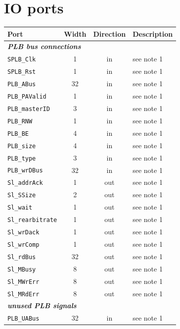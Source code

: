 \section{IO ports}
\begin{tabular}{|l|c|c|l|}
	\hline
	\rowcolor{Gray}
	\textbf{Port} & \textbf{Width} & \textbf{Direction} & \textbf{Description} \\
	\hline
	\multicolumn{4}{|l|}{\textit{\textbf{PLB bus connections}}} \\
	\hline
	\verb|SPLB_Clk| & 1     & in & see note 1 \\
	\hline
	\verb|SPLB_Rst| & 1     & in & see note 1 \\
	\hline
	\verb|PLB_ABus| & 32    & in & see note 1 \\
	\hline
	\verb|PLB_PAValid| & 1     & in & see note 1 \\
	\hline
	\verb|PLB_masterID| & 3     & in & see note 1 \\
	\hline
	\verb|PLB_RNW| & 1     & in & see note 1 \\
	\hline
	\verb|PLB_BE| & 4     & in & see note 1 \\
	\hline
	\verb|PLB_size| & 4     & in & see note 1 \\
	\hline
	\verb|PLB_type| & 3     & in & see note 1 \\
	\hline
	\verb|PLB_wrDBus| & 32    & in & see note 1 \\
	\hline
	\verb|Sl_addrAck| & 1     & out & see note 1 \\
	\hline
	\verb|Sl_SSize| & 2     & out & see note 1 \\
	\hline
	\verb|Sl_wait| & 1     & out & see note 1 \\
	\hline
	\verb|Sl_rearbitrate| & 1     & out & see note 1 \\
	\hline
	\verb|Sl_wrDack| & 1     & out & see note 1 \\
	\hline
	\verb|Sl_wrComp| & 1     & out & see note 1 \\
	\hline
	\verb|Sl_rdBus| & 32    & out & see note 1 \\
	\hline
	\verb|Sl_MBusy| & 8     & out & see note 1 \\
	\hline
	\verb|Sl_MWrErr| & 8     & out & see note 1 \\
	\hline
	\verb|Sl_MRdErr| & 8     & out & see note 1 \\
	\hline
	\multicolumn{4}{|l|}{\textit{\textbf{unused PLB signals}}} \\
	\hline
	\verb|PLB_UABus| & 32    & in & see note 1 \\

\end{tabular}
